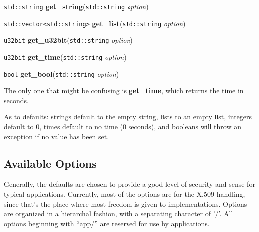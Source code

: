 \documentclass{article}
\newcommand{\function}[1]{\textbf{#1}}
\newcommand{\type}[1]{\texttt{#1}}
\renewcommand{\arg}[1]{\textsl{#1}}
\begin{document}
\type{std::string} \function{get\_string}(\type{std::string} \arg{option})

\type{std::vector<std::string>} \function{get\_list}(\type{std::string}
\arg{option})

\type{u32bit} \function{get\_u32bit}(\type{std::string} \arg{option})

\type{u32bit} \function{get\_time}(\type{std::string} \arg{option})

\type{bool} \function{get\_bool}(\type{std::string} \arg{option})

The only one that might be confusing is \function{get\_time}, which returns the
time in seconds.

As to defaults: strings default to the empty string, lists to an empty list,
integers default to 0, times default to no time (0 seconds), and booleans will
throw an exception if no value has been set.

\subsection{Available Options}

Generally, the defaults are chosen to provide a good level of security and
sense for typical applications. Currently, most of the options are for the
X.509 handling, since that's the place where most freedom is given to
implementations. Options are organized in a hierarchal fashion, with a
separating character of '/'. All options beginning with ``app/'' are reserved
for use by applications.

\newcommand{\confopt}[4]{
   \textbf{``#1''}, (\textbf{#2}, default \textbf{#3}): #4.
}
\end{document}
